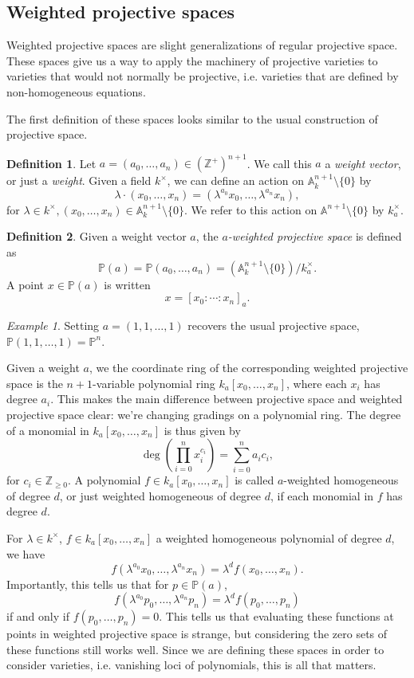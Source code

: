 \documentclass[12pt,twoside]{reedthesis}
\theoremstyle{plain}
\theoremstyle{definition}
\newtheorem{definition}{Definition}[section]
\theoremstyle{remark}
\newtheorem{example}{Example}[section]
\newcommand{\ZZ}{\mathbb{Z}}
\newcommand{\Affine}{\mathbb{A}}
\newcommand{\Proj}{\mathbb{P}}
\begin{document}
\subsection{Weighted projective spaces}
Weighted projective spaces are slight generalizations of regular projective space. These spaces give us a way to apply the machinery of projective varieties to varieties that would not normally be projective, i.e. varieties that are defined by non-homogeneous equations.

The first definition of these spaces looks similar to the usual construction of projective space.
\begin{definition}
Let $a=(a_0,\ldots,a_n)\in(\ZZ^+)^{n+1}$. We call this $a$ a \emph{weight vector}, or just a \emph{weight}. Given a field $k^\times$, we can define an action on $\Affine^{n+1}_k\setminus\{0\}$ by
\[
\lambda\cdot(x_0,\ldots,x_n)=(\lambda^{a_0}x_0,\ldots,\lambda^{a_n}x_n),
\]
for $\lambda\in k^\times, (x_0,\ldots,x_n)\in\Affine^{n+1}_k\setminus\{0\}$. We refer to this action on $\Affine^{n+1}\setminus\{0\}$ by $k^\times_a$.
\end{definition}
\begin{definition}
Given a weight vector $a$, the \emph{$a$-weighted projective space} is defined as
\[
\Proj(a)=\Proj(a_0,\ldots,a_n)=(\Affine^{n+1}_k\setminus\{0\})/k^\times_a.
\]
A point $x\in\Proj(a)$ is written
\[
x=[x_0:\cdots:x_n]_a.
\]
\end{definition}
\begin{example}
Setting $a=(1,1,\ldots,1)$ recovers the usual projective space, $\Proj(1,1,\ldots,1)=\Proj^n$.
\end{example}
Given a weight $a$, we the coordinate ring of the corresponding weighted projective space is the $n+1$-variable polynomial ring $k_a[x_0,\ldots,x_n]$, where each $x_i$ has degree $a_i$. This makes the main difference between projective space and weighted projective space clear: we're changing gradings on a polynomial ring. The degree of a monomial in $k_a[x_0,\ldots,x_n]$ is thus given by
\[
\deg\left(\prod_{i=0}^n x_i^{c_i}\right)=\sum_{i=0}^n a_ic_i,
\]
for $c_i\in\ZZ_{\geq0}$. A polynomial $f\in k_a[x_0,\ldots,x_n]$ is called $a$-weighted homogeneous of degree $d$, or just weighted homogeneous of degree $d$, if each monomial in $f$ has degree $d$. 

For $\lambda\in k^\times$, $f\in k_a[x_0,\ldots,x_n]$ a weighted homogeneous polynomial of degree $d$, we have
\[
f(\lambda^{a_0}x_0,\ldots,\lambda^{a_n}x_n)=\lambda^d f(x_0,\ldots,x_n).
\]
Importantly, this tells us that for $p\in\Proj(a)$, 
\[
f(\lambda^{a_0}p_0,\ldots,\lambda^{a_n}p_n)=\lambda^d f(p_0,\ldots,p_n)
\]
if and only if $f(p_0,\ldots,p_n)=0$. This tells us that evaluating these functions at points in weighted projective space is strange, but considering the zero sets of these functions still works well. Since we are defining these spaces in order to consider varieties, i.e. vanishing loci of polynomials, this is all that matters.
\end{document}
